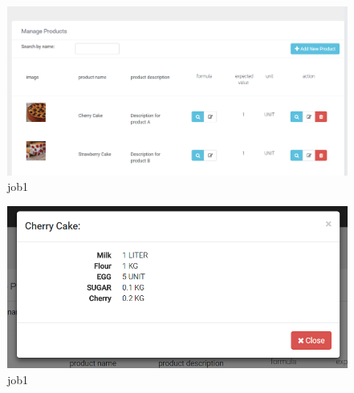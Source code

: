\documentclass[a4paper,11pt,twoside]{report}
\theoremstyle{definition}
\begin{document}
\begin{figure}[h!]
\begin{center}
\includegraphics[width=\textwidth]{AS/product/1}
\end{center}
\caption{job1}
\end{figure}
\thispagestyle{empty}


\begin{figure}[h!]
\begin{center}
\includegraphics[width=\textwidth]{AS/product/2}
\end{center}
\caption{job1}
\end{figure}
\thispagestyle{empty}
\end{document}
